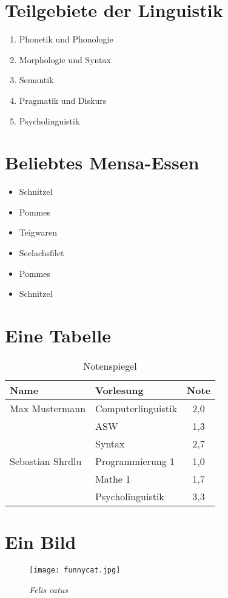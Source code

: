 \documentclass[a4paper]{article}
\begin{document}
\section{Teilgebiete der Linguistik}
\begin{enumerate}[label=\Roman*]
\item Phonetik und Phonologie
\item Morphologie und Syntax
\item Semantik
\item Pragmatik und Diskurs
\item Psycholinguistik
\end{enumerate}

\section{Beliebtes Mensa-Essen}
\begin{itemize}[label=\smiley]
\item Schnitzel
\item Pommes
\item Teigwaren
\item Seelachsfilet
\item Pommes
\item Schnitzel
\end{itemize}

\section{Eine Tabelle}
\begin{table}[H]
\centering
\begin{tabular}{llc}
\toprule
\textbf{Name} & \textbf{Vorlesung} & \textbf{Note}\\ \midrule
Max Mustermann & Computerlinguistik & 2{,}0\\
		~		& ASW & 1{,}3\\
		~		& Syntax & 2{,}7\\
Sebastian Shrdlu & Programmierung 1 & 1{,}0\\
		~		& Mathe 1 & 1{,}7	\\	
		~		& Psycholinguistik & 3{,}3\\ \bottomrule

\end{tabular}
\caption{Notenspiegel}
\end{table}

\section{Ein Bild}
\begin{figure}[H]
\centering \texttt{[image: funnycat.jpg]}
\caption{\textit{Felis catus}}
\end{figure}
\end{document}

